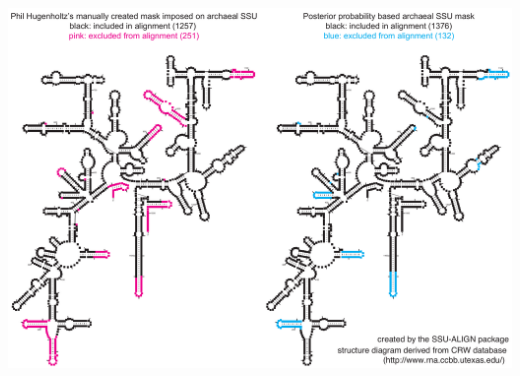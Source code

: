 \documentclass[landscape]{slides}
\begin{document}
\begin{slide}
\begin{center}
\includegraphics[width=10.5in]{figs/archaea-mask-ph-v-pp-both}
\end{center}
\vfill
\end{slide}
\end{document}
